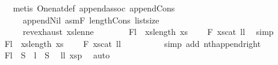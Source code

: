 \begin{isabellebody}
\ \ \ \ \ \ \ \ \isamarkupfalse%
\ {\isacharparenleft}{\kern0pt}metis\ One{\isacharunderscore}{\kern0pt}nat{\isacharunderscore}{\kern0pt}def\ append{\isachardot}{\kern0pt}assoc\ append{\isacharunderscore}{\kern0pt}Cons\isanewline
\ \ \ \ \ \ \ \ \ \ \ \ append{\isacharunderscore}{\kern0pt}Nil\ asmF{\isacharparenleft}{\kern0pt}{}{\isacharparenright}{\kern0pt}\ length{\isacharunderscore}{\kern0pt}Cons\ list{\isachardot}{\kern0pt}size{\isacharparenleft}{\kern0pt}{}{\isacharparenright}{\kern0pt}\isanewline
\ \ \ \ \ \ \ \ \ \ \ \ rev{\isacharunderscore}{\kern0pt}exhaust\ xs{}{\isacharunderscore}{\kern0pt}len{\isacharunderscore}{\kern0pt}ne{\isacharunderscore}{\kern0pt}{}{\isacharparenright}{\kern0pt}\isanewline
\isanewline
\ \ \ \ \ \ \isamarkupfalse%
\ F{}{\isacharcolon}{\kern0pt}{\isachardoublequoteopen}l{}\ {\isacharequal}{\kern0pt}\ xs{\isacharbang}{\kern0pt}{\isacharparenleft}{\kern0pt}length\ xs{}\ {\isacharminus}{\kern0pt}\ {}{\isacharparenright}{\kern0pt}{\isachardoublequoteclose}\ \isamarkupfalse%
\ F{}{\isacharparenleft}{\kern0pt}{}{\isacharparenright}{\kern0pt}\ xs{\isacharunderscore}{\kern0pt}cat\ l{}l{}\ \isamarkupfalse%
\ simp\isanewline
\ \ \ \ \ \ \isamarkupfalse%
\ F{}{\isacharcolon}{\kern0pt}{\isachardoublequoteopen}l{}\ {\isacharequal}{\kern0pt}\ xs{\isacharbang}{\kern0pt}{\isacharparenleft}{\kern0pt}length\ xs{}\ {\isacharminus}{\kern0pt}\ {}{\isacharparenright}{\kern0pt}{\isachardoublequoteclose}\ \isamarkupfalse%
\ F{}{\isacharparenleft}{\kern0pt}{}{\isacharparenright}{\kern0pt}\ xs{\isacharunderscore}{\kern0pt}cat\ l{}l{}\isanewline
\ \ \ \ \ \ \ \ \isamarkupfalse%
\ {\isacharparenleft}{\kern0pt}simp\ add{\isacharcolon}{\kern0pt}\ nth{\isacharunderscore}{\kern0pt}append{\isacharunderscore}{\kern0pt}right{\isacharparenright}{\kern0pt}\isanewline
\ \ \ \ \ \ \isamarkupfalse%
\ F{}{\isacharcolon}{\kern0pt}{\isachardoublequoteopen}l{}\ {\isasymin}\ S{}\ {\isasymand}\ l{}\ {\isasymin}\ S{}{\isachardoublequoteclose}\ \isamarkupfalse%
\ l{}l{}\ xs{}p{}\ \isamarkupfalse%
\ auto\isanewline
\isanewline
\ \ \ \ \ \ \isamarkupfalse%

\end{isabellebody}
